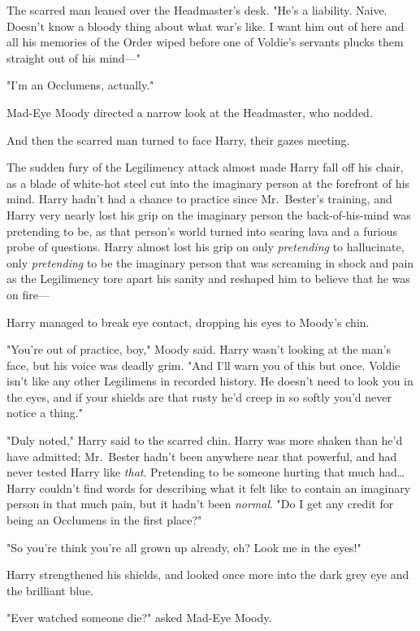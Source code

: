 The scarred man leaned over the Headmaster's desk. "He's a liability. Naive. 
Doesn't know a bloody thing about what war's like. I want him out of here and 
all his memories of the Order wiped before one of Voldie's servants plucks them 
straight out of his mind---"

"I'm an Occlumens, actually."

Mad-Eye Moody directed a narrow look at the Headmaster, who nodded.

And then the scarred man turned to face Harry, their gazes meeting.

The sudden fury of the Legilimency attack almost made Harry fall off his chair, 
as a blade of white-hot steel cut into the imaginary person at the forefront of 
his mind. Harry hadn't had a chance to practice since Mr.~Bester's training, 
and Harry very nearly lost his grip on the imaginary person the 
back-of-his-mind was pretending to be, as that person's world turned into 
searing lava and a furious probe of questions. Harry almost lost his grip on 
only \emph{pretending} to hallucinate, only \emph{pretending} to be the 
imaginary person that was screaming in shock and pain as the Legilimency tore 
apart his sanity and reshaped him to believe that he was on fire---

Harry managed to break eye contact, dropping his eyes to Moody's chin.

"You're out of practice, boy," Moody said. Harry wasn't looking at the man's 
face, but his voice was deadly grim. "And I'll warn you of this but once. 
Voldie isn't like any other Legilimens in recorded history. He doesn't need to 
look you in the eyes, and if your shields are that rusty he'd creep in so 
softly you'd never notice a thing."

"Duly noted," Harry said to the scarred chin. Harry was more shaken than he'd 
have admitted; Mr.~Bester hadn't been anywhere near that powerful, and had 
never tested Harry like \emph{that}. Pretending to be someone hurting that much 
had{\ldots} Harry couldn't find words for describing what it felt like to 
contain an imaginary person in that much pain, but it hadn't been 
\emph{normal}. "Do I get any credit for being an Occlumens in the first place?"

"So you're think you're all grown up already, eh? Look me in the eyes!"

Harry strengthened his shields, and looked once more into the dark grey eye and 
the brilliant blue.

"Ever watched someone die?" asked Mad-Eye Moody.


